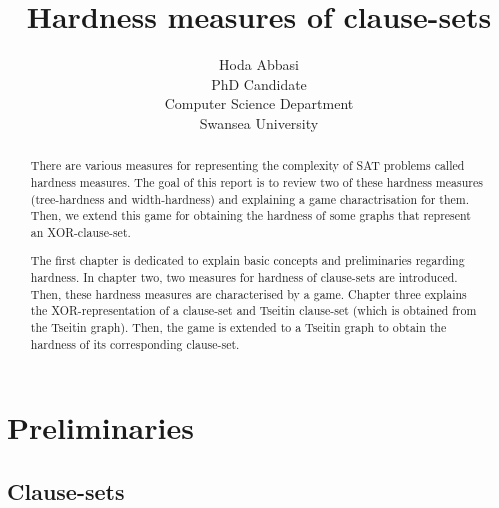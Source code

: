 \documentclass{report}
\begin{document}
\title{Hardness measures of clause-sets}

\author{Hoda Abbasi\\
        PhD Candidate\\
        Computer Science Department\\
        Swansea University\\}
\maketitle

\begin{abstract}

There are various measures for representing the complexity of SAT problems called hardness measures. The goal of this report is to review two of these hardness measures (tree-hardness and width-hardness) and explaining a game charactrisation for them. Then, we extend this game for obtaining the hardness of some graphs that represent an XOR-clause-set. 

The first chapter is dedicated to explain basic concepts and preliminaries regarding hardness. In chapter two, two measures for hardness of clause-sets are introduced. Then, these hardness measures are characterised by a game. Chapter three explains the XOR-representation of a clause-set and Tseitin clause-set (which is obtained from the Tseitin graph). Then, the game is extended to a Tseitin graph to obtain the hardness of its corresponding clause-set.

\end{abstract}

\tableofcontents
\chapter{Preliminaries}
\label{cha:Preliminaries}

\section{Clause-sets}
\label{sec:Clause-sets}
\end{document}
